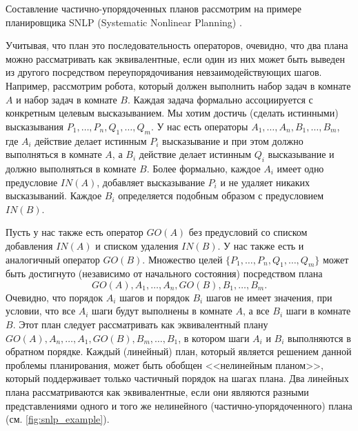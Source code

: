 \documentclass[b5paper,11pt]{book}
\numberwithin{Def}{section}
\numberwithin{Th}{chapter}
\numberwithin{St}{chapter}
\begin{document}
	Составление частично-упорядоченных планов рассмотрим на примере планировщика SNLP (Systematic Nonlinear Planning) \cite{McAllester1991}. 
	
	Учитывая, что план это последовательность операторов, очевидно, что два плана можно рассматривать как эквивалентные, если один из них может быть выведен из другого посредством	переупорядочивания невзаимодействующих шагов. Например, рассмотрим робота, который	должен выполнить набор задач в комнате $A$ и набор задач в комнате $B$. Каждая задача формально ассоциируется с конкретным целевым высказыванием. Мы хотим достичь (сделать истинными) высказывания $P_1, \dots, P_n, Q_1, \dots, Q_m$. У нас есть операторы $A_1, \dots, A_n, B_1, \dots, B_m$, где $A_i$ действие делает истинным $P_i$ высказывание и при этом должно выполняться в комнате $A$, а $B_i$ действие делает истинным $Q_i$ высказывание и должно выполняться в комнате $B$. Более
	формально, каждое $A_i$ имеет одно предусловие $IN(A)$, добавляет высказывание $P_i$ и не удаляет никаких высказываний. Каждое $B_i$ определяется подобным образом с предусловием $IN(B)$.
	
	Пусть у нас также есть оператор $GO(A)$ без предусловий со списком добавления $IN(A)$ и списком удаления $IN(B)$. У нас также есть и аналогичный оператор $GO(B)$. Множество целей	$\{P_1, \dots, P_n, Q_1, \dots, Q_m\}$ может быть достигнуто (независимо от начального состояния) посредством плана 
	\[
		GO(A), A_1, \dots, A_n, GO(B), B_1, \dots, B_m.
	\] 
	Очевидно, что порядок $A_i$ шагов и порядок $B_i$ шагов не имеет значения, при условии, что все $A_i$ шаги будут выполнены в комнате $A$, а все $B_i$ шаги в комнате $B$. Этот план следует рассматривать как эквивалентный плану $GO(A), A_n, \dots, A_1, GO(B), B_m, \dots, B_1$, в котором шаги $A_i$ и $B_i$ выполняются в обратном порядке. Каждый (линейный) план, который является решением данной проблемы планирования, может быть обобщен <<нелинейным планом>>, который поддерживает только частичный порядок на шагах	плана. Два линейных плана рассматриваются как эквивалентные, если они являются разными представлениями одного и того же нелинейного (частично-упорядоченного) плана (см. \autoref{fig:snlp_example}).
	
\end{document}
